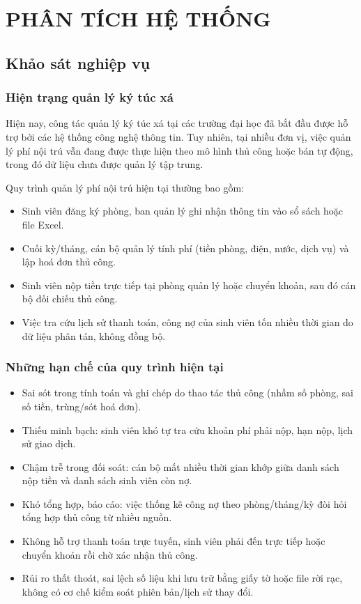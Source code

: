 \clearpage
\chapter{PHÂN TÍCH HỆ THỐNG}

\section{Khảo sát nghiệp vụ}

\subsection{Hiện trạng quản lý ký túc xá}

Hiện nay, công tác quản lý ký túc xá tại các trường đại học đã bắt đầu được hỗ trợ bởi các hệ thống công nghệ thông tin. Tuy nhiên, tại nhiều đơn vị, việc quản lý phí nội trú vẫn đang được thực hiện theo mô hình thủ công hoặc bán tự động, trong đó dữ liệu chưa được quản lý tập trung.

Quy trình quản lý phí nội trú hiện tại thường bao gồm:

\begin{itemize}[leftmargin=1.4em]
\item Sinh viên đăng ký phòng, ban quản lý ghi nhận thông tin vào sổ sách hoặc file Excel.
\item Cuối kỳ/tháng, cán bộ quản lý tính phí (tiền phòng, điện, nước, dịch vụ) và lập hoá đơn thủ công.
\item Sinh viên nộp tiền trực tiếp tại phòng quản lý hoặc chuyển khoản, sau đó cán bộ đối chiếu thủ công.
\item Việc tra cứu lịch sử thanh toán, công nợ của sinh viên tốn nhiều thời gian do dữ liệu phân tán, không đồng bộ.
\end{itemize}

\subsection{Những hạn chế của quy trình hiện tại}

\begin{itemize}[leftmargin=1.4em]
\item Sai sót trong tính toán và ghi chép do thao tác thủ công (nhầm số phòng, sai số tiền, trùng/sót hoá đơn).
\item Thiếu minh bạch: sinh viên khó tự tra cứu khoản phí phải nộp, hạn nộp, lịch sử giao dịch.
\item Chậm trễ trong đối soát: cán bộ mất nhiều thời gian khớp giữa danh sách nộp tiền và danh sách sinh viên còn nợ.
\item Khó tổng hợp, báo cáo: việc thống kê công nợ theo phòng/tháng/kỳ đòi hỏi tổng hợp thủ công từ nhiều nguồn.
\item Không hỗ trợ thanh toán trực tuyến, sinh viên phải đến trực tiếp hoặc chuyển khoản rồi chờ xác nhận thủ công.
\item Rủi ro thất thoát, sai lệch số liệu khi lưu trữ bằng giấy tờ hoặc file rời rạc, không có cơ chế kiểm soát phiên bản/lịch sử thay đổi.
\end{itemize}

